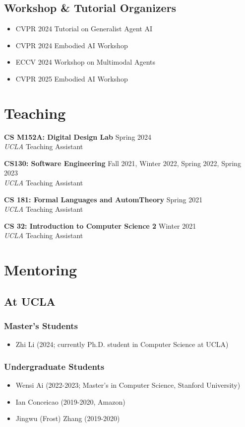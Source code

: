 \documentclass[11pt,a4paper]{article}
\newcommand{\entry}[4]{
  \textbf{#1} \hfill #2 \\
  \textit{#3} \hfill #4 \\
  \vspace{0.5em}
}
\begin{document}
\subsection*{Workshop \& Tutorial Organizers}
\begin{itemize}[leftmargin=*]
\item CVPR 2024 Tutorial on Generalist Agent AI
\item CVPR 2024 Embodied AI Workshop
\item ECCV 2024 Workshop on Multimodal Agents
\item CVPR 2025 Embodied AI Workshop
\end{itemize}

\section*{Teaching}
\entry{CS M152A: Digital Design Lab}{Spring 2024}{UCLA}{Teaching Assistant}
\entry{CS130: Software Engineering}{Fall 2021, Winter 2022, Spring 2022, Spring 2023}{UCLA}{Teaching Assistant}
\entry{CS 181: Formal Languages and Autom\ata Theory}{Spring 2021}{UCLA}{Teaching Assistant}
\entry{CS 32: Introduction to Computer Science 2}{Winter 2021}{UCLA}{Teaching Assistant}

\section*{Mentoring}
\subsection*{At UCLA}
\subsubsection*{Master's Students}
\begin{itemize}[leftmargin=*]
\item Zhi Li (2024; currently Ph.D. student in Computer Science at UCLA)
\end{itemize}

\subsubsection*{Undergraduate Students}
\begin{itemize}[leftmargin=*]
\item Wensi Ai (2022-2023; Master's in Computer Science, Stanford University)
\item Ian Conceicao (2019-2020, Amazon)
\item Jingwu (Frost) Zhang (2019-2020)
\end{itemize}
\end{document}
